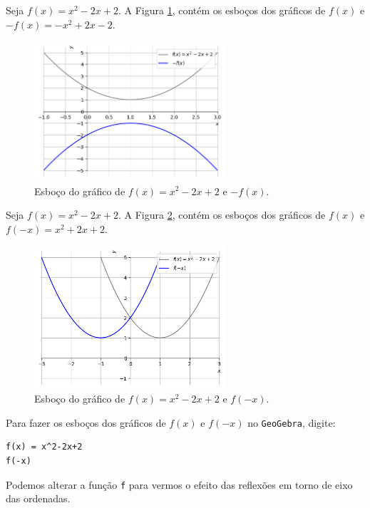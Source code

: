 \documentclass[../main.tex]{subfiles}
\begin{document}
\begin{ex}
  Seja $f(x) = x^2-2x+2$. A Figura \ref{fig:ex_reflex1}, contém os esboços dos gráficos de $f(x)$ e $-f(x) = -x^2+2x-2$.

  \begin{figure}[H]
    \centering
    \includegraphics[width=0.63\textwidth]{fig_func/fig_ex_reflex}
    \caption{Esboço do gráfico de $f(x) = x^2-2x+2$ e $-f(x)$.}
    \label{fig:ex_reflex1}
  \end{figure}

\end{ex}

\begin{ex}
  Seja $f(x) = x^2-2x+2$. A Figura \ref{fig:ex_reflex}, contém os esboços dos gráficos de $f(x)$ e $f(-x) = x^2+2x+2$.

  \begin{figure}[H]
    \centering
    \includegraphics[width=0.63\textwidth]{fig_func/fig_ex_refley}
    \caption{Esboço do gráfico de $f(x) = x^2-2x+2$ e $f(-x)$.}
    \label{fig:ex_reflex}
  \end{figure}

  Para fazer os esboços dos gráficos de $f(x)$ e $f(-x)$ no \verb+GeoGebra+, digite:
  \begin{verbatim}
f(x) = x^2-2x+2
f(-x)
\end{verbatim}
  Podemos alterar a função \verb+f+ para vermos o efeito das reflexões em torno de eixo das ordenadas.
\end{ex}
\end{document}
